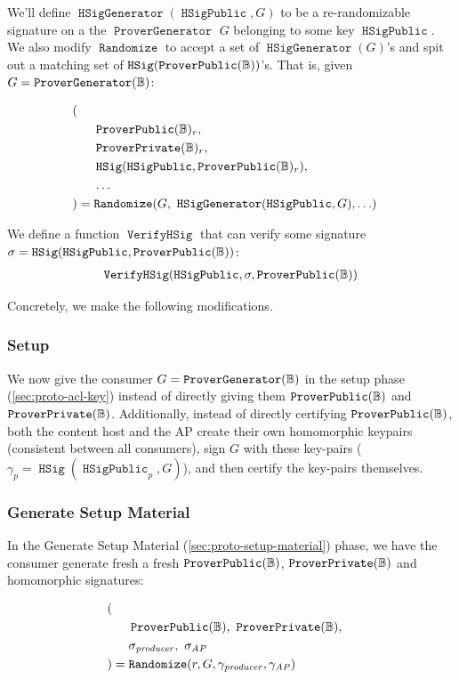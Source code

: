 \documentclass[pdftex,12pt,a4papaer,twoside,notitlepage]{report}
\DeclareMathOperator{\vh}{\mathtt{VerifyHSig}}
\DeclareMathOperator{\Hsig}{\mathtt{HSig}}
\DeclareMathOperator{\PvecG}{\mathtt{ProverGenerator}}
\DeclareMathOperator{\Hp}{\mathtt{HSigPublic}}
\DeclareMathOperator{\HsigG}{\mathtt{HSigGenerator}}
\DeclareMathOperator{\rand}{\mathtt{Randomize}}
\begin{document}
We'll define $\HsigG(\Hp, G)$ to be a re-randomizable signature on a the
$\PvecG$ $G$ belonging to some key $\Hp$. We also modify $\rand$ to accept a set
of $\HsigG(G)$'s and spit out a matching set of $\Hsig(\Pv)$'s. That is, given
$G =\Pvg$: \vspace{-2em}
\begin{singlespace}
\begin{align*}
  ( \\
    &~~~~\Pv_r,  \\
    &~~~~\Sv_r, \\
    &~~~~\Hsig(\Hp, \Pv_r),\\
    &~~~~\ldots \\
  ) &= \rand(G,~\HsigG(\Hp, G), \ldots)
\end{align*}
\end{singlespace}

We define a function $\vh$ that can verify some signature $\sigma = \Hsig(\Hp, \Pv)$:
\begin{align*}
  \vh(\Hp, \sigma, \Pv)
\end{align*}

Concretely, we make the following modifications.

\subsubsection{Setup}

We now give the consumer $G = \Pvg$ in the setup phase
(\cref{sec:proto-acl-key}) instead of directly giving them $\operatorname{\mathtt{ProverPublic}}(\mathbb{B})$ and $\operatorname{\mathtt{ProverPrivate}}(\mathbb{B})$.
Additionally, instead of directly certifying $\operatorname{\mathtt{ProverPublic}}(\mathbb{B})$, both the content host and
the AP create their own homomorphic keypairs (consistent between all consumers),
sign $G$ with these key-pairs ($\gamma_p = \Hsig(\Hp_p, G)$), and then certify
the key-pairs themselves.

\subsubsection{Generate Setup Material}

In the Generate Setup Material (\cref{sec:proto-setup-material}) phase, we have
the consumer generate fresh a fresh $\operatorname{\mathtt{ProverPublic}}(\mathbb{B})$, $\operatorname{\mathtt{ProverPrivate}}(\mathbb{B})$ and homomorphic signatures:
\vspace{-3em}
\begin{singlespace}
\begin{align*}
  ( \\
    &~~~~\Pv,~\Sv, \\
    &~~~~\sigma_{\mathit{producer}},~\sigma_{\mathit{AP}} \\
  ) &= \rand( r,  G,  \gamma_{\mathit{producer}},\gamma_{\mathit{AP}})
\end{align*}
\end{singlespace}
\end{document}
